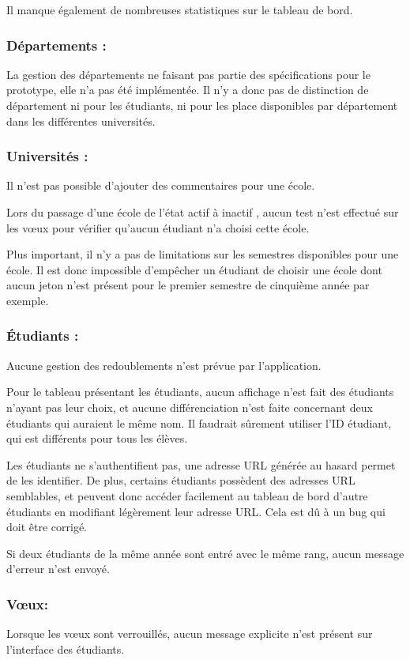 Il manque également de nombreuses statistiques sur le tableau de bord.

\subsubsection{Départements :}
La gestion des départements ne faisant pas partie des spécifications pour le prototype, elle n'a pas été implémentée. Il n'y a donc pas de distinction de département ni pour les étudiants, ni pour les place disponibles par département dans les différentes universités.


\subsubsection{Universités :}
Il n'est pas possible d'ajouter des commentaires pour une école.

Lors du passage d'une école de l'état \og actif \fg{} à \og inactif \fg{}, aucun test n'est effectué sur les vœux pour vérifier qu'aucun étudiant n'a choisi cette école.

Plus important, il n'y a pas de limitations sur les semestres disponibles pour une école. Il est donc impossible d'empêcher un étudiant de choisir une école dont aucun jeton n'est présent pour le premier semestre de cinquième année par exemple.


\subsubsection{Étudiants :}
Aucune gestion des redoublements n'est prévue par l'application.

Pour le tableau présentant les étudiants, aucun affichage n'est fait des étudiants n'ayant pas leur choix, et aucune différenciation n'est faite concernant deux étudiants qui auraient le même nom. Il faudrait sûrement utiliser l'ID étudiant, qui est différents pour tous les élèves.

Les étudiants ne s'authentifient pas, une adresse URL générée au hasard permet de les identifier. De plus, certains étudiants possèdent des adresses URL semblables, et peuvent donc accéder facilement au tableau de bord d'autre étudiants en modifiant légèrement leur adresse URL. Cela est dû à un bug qui doit être corrigé.

Si deux étudiants de la même année sont entré avec le même rang, aucun message d'erreur n'est envoyé.


\subsubsection{Vœux:}
Lorsque les vœux sont verrouillés, aucun message explicite n'est présent sur l'interface des étudiants.

